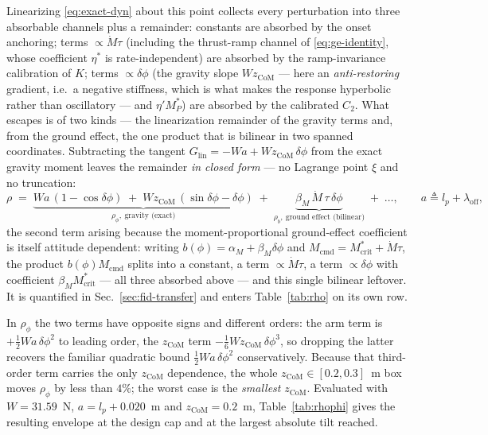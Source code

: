 Linearizing \eqref{eq:exact-dyn} about this point collects every
perturbation into three absorbable channels plus a remainder: constants
are absorbed by the onset anchoring; terms $\propto \dot M\tau$
(including the thrust-ramp channel of \eqref{eq:ge-identity}, whose
coefficient $\eta^*$ is rate-independent) are absorbed by the
ramp-invariance calibration of $K$; terms $\propto \delta\phi$ (the
gravity slope $W z_{\mathrm{CoM}}$ — here an \emph{anti-restoring}
gradient, i.e.\ a negative stiffness, which is what makes the response
hyperbolic rather than oscillatory — and $\eta' M_P^*$) are absorbed by
the calibrated $C_2$. What escapes is of two kinds — the linearization
remainder of the gravity terms and, from the ground effect, the one
product that is bilinear in two spanned coordinates. Subtracting the
tangent $G_{\mathrm{lin}} = -Wa + W z_{\mathrm{CoM}}\,\delta\phi$ from
the exact gravity moment leaves the remainder \emph{in closed form} —
no Lagrange point $\xi$ and no truncation:
\begin{equation}
  \rho \;=\; \underbrace{W a\,(1-\cos\delta\phi)
             \;+\; W z_{\mathrm{CoM}}\,(\sin\delta\phi - \delta\phi)}
             _{\rho_\phi,\ \text{gravity (exact)}}
     \;+\; \underbrace{\beta_M\,\dot M\,\tau\,\delta\phi}
             _{\rho_b,\ \text{ground effect (bilinear)}} \;+\; \dots,
  \qquad a \triangleq l_p+\lambda_{\mathrm{off}} ,
  \label{eq:lagrange}
\end{equation}
the second term arising because the moment-proportional ground-effect
coefficient is itself attitude dependent: writing
$b(\phi) = \alpha_M + \beta_M\delta\phi$ and
$M_{\mathrm{cmd}} = M^*_{\mathrm{crit}} + \dot M\tau$, the product
$b(\phi) M_{\mathrm{cmd}}$ splits into a constant, a term
$\propto\dot M\tau$, a term $\propto\delta\phi$ with coefficient
$\beta_M M^*_{\mathrm{crit}}$ — all three absorbed above — and this
single bilinear leftover. It is quantified in
Sec.~\ref{sec:fid-transfer} and enters Table~\ref{tab:rho} on its own
row.

In $\rho_\phi$ the two terms have opposite signs and different orders:
the arm term is $+\tfrac12 W a\,\delta\phi^2$ to leading order, the
$z_{\mathrm{CoM}}$ term $-\tfrac16 W z_{\mathrm{CoM}}\,\delta\phi^3$, so
dropping the latter recovers the familiar quadratic bound
$\tfrac12 W a\,\delta\phi^2$ conservatively. Because that third-order
term carries the only $z_{\mathrm{CoM}}$ dependence, the whole
$z_{\mathrm{CoM}}\in[0.2,0.3]$~m box moves $\rho_\phi$ by less than
$4\%$; the worst case is the \emph{smallest} $z_{\mathrm{CoM}}$.
Evaluated with $W = 31.59$~N, $a = l_p + 0.020$~m and
$z_{\mathrm{CoM}} = 0.2$~m, Table~\ref{tab:rhophi} gives the resulting
envelope at the design cap and at the largest absolute tilt reached.

